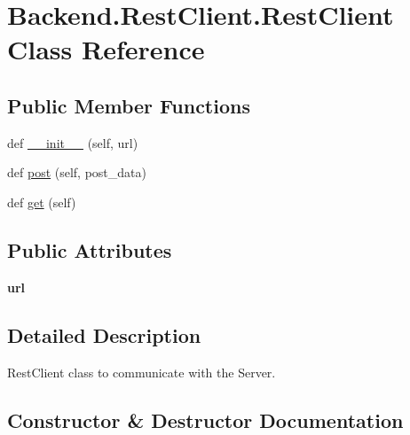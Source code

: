 \hypertarget{class_backend_1_1_rest_client_1_1_rest_client}{}\section{Backend.\+Rest\+Client.\+Rest\+Client Class Reference}
\label{class_backend_1_1_rest_client_1_1_rest_client}
\subsection*{Public Member Functions}
\begin{DoxyCompactItemize}
\item 
def \hyperlink{class_backend_1_1_rest_client_1_1_rest_client_acf8982af063521b5cc9efecc2c17a6bf}{\+\_\+\+\_\+init\+\_\+\+\_\+} (self, url)
\item 
def \hyperlink{class_backend_1_1_rest_client_1_1_rest_client_a2178f363f425eab9c857c0af25c24b71}{post} (self, post\+\_\+data)
\item 
def \hyperlink{class_backend_1_1_rest_client_1_1_rest_client_adf9e226195f961c90d0d274804dd6a75}{get} (self)
\end{DoxyCompactItemize}
\subsection*{Public Attributes}
\begin{DoxyCompactItemize}
\item 
\hypertarget{class_backend_1_1_rest_client_1_1_rest_client_a263d3589f52835f37d701db5d9e3ea6e}{}\label{class_backend_1_1_rest_client_1_1_rest_client_a263d3589f52835f37d701db5d9e3ea6e} 
{\bfseries url}
\end{DoxyCompactItemize}


\subsection{Detailed Description}
\begin{DoxyVerb}RestClient class to communicate with the Server.\end{DoxyVerb}
 

\subsection{Constructor \& Destructor Documentation}
\hypertarget{class_backend_1_1_rest_client_1_1_rest_client_acf8982af063521b5cc9efecc2c17a6bf}{}\label{class_backend_1_1_rest_client_1_1_rest_client_acf8982af063521b5cc9efecc2c17a6bf} 

